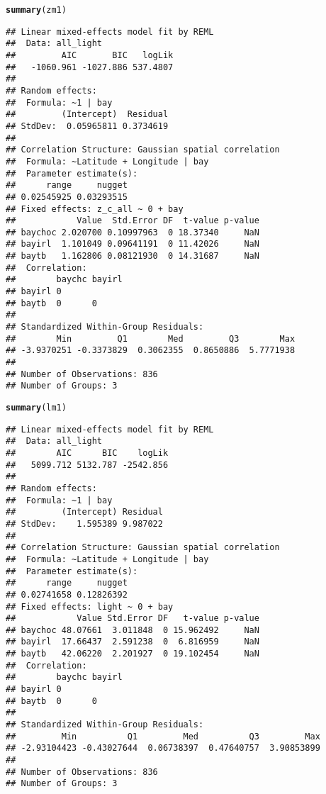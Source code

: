 \documentclass{article}\usepackage[]{graphicx}\usepackage[]{color}
\makeatletter
\newcommand{\hlstd}[1]{\textcolor[rgb]{0.345,0.345,0.345}{#1}}%
\newcommand{\hlkwd}[1]{\textcolor[rgb]{0.737,0.353,0.396}{\textbf{#1}}}%
\newenvironment{kframe}{%
 \def\at@end@of@kframe{}%
 \ifinner\ifhmode%
  \def\at@end@of@kframe{\end{minipage}}%
  \begin{minipage}{\columnwidth}%
 \fi\fi%
 \def\FrameCommand##1{\hskip\@totalleftmargin \hskip-\fboxsep
 \colorbox{shadecolor}{##1}\hskip-\fboxsep
     \hskip-\linewidth \hskip-\@totalleftmargin \hskip\columnwidth}%
 \MakeFramed {\advance\hsize-\width
   \@totalleftmargin\z@ \linewidth\hsize
   \@setminipage}}%
 {\par\unskip\endMakeFramed%
 \at@end@of@kframe}
\newenvironment{knitrout}{}{} %
\makeatother
\begin{document}
\begin{knitrout}
\color{fgcolor}\begin{kframe}
\begin{alltt}
\hlkwd{summary}\hlstd{(zm1)}
\end{alltt}
\begin{verbatim}
## Linear mixed-effects model fit by REML
##  Data: all_light 
##         AIC       BIC   logLik
##   -1060.961 -1027.886 537.4807
## 
## Random effects:
##  Formula: ~1 | bay
##         (Intercept)  Residual
## StdDev:  0.05965811 0.3734619
## 
## Correlation Structure: Gaussian spatial correlation
##  Formula: ~Latitude + Longitude | bay 
##  Parameter estimate(s):
##      range     nugget 
## 0.02545925 0.03293515 
## Fixed effects: z_c_all ~ 0 + bay 
##            Value  Std.Error DF  t-value p-value
## baychoc 2.020700 0.10997963  0 18.37340     NaN
## bayirl  1.101049 0.09641191  0 11.42026     NaN
## baytb   1.162806 0.08121930  0 14.31687     NaN
##  Correlation: 
##        baychc bayirl
## bayirl 0            
## baytb  0      0     
## 
## Standardized Within-Group Residuals:
##        Min         Q1        Med         Q3        Max 
## -3.9370251 -0.3373829  0.3062355  0.8650886  5.7771938 
## 
## Number of Observations: 836
## Number of Groups: 3
\end{verbatim}
\begin{alltt}
\hlkwd{summary}\hlstd{(lm1)}
\end{alltt}
\begin{verbatim}
## Linear mixed-effects model fit by REML
##  Data: all_light 
##        AIC      BIC    logLik
##   5099.712 5132.787 -2542.856
## 
## Random effects:
##  Formula: ~1 | bay
##         (Intercept) Residual
## StdDev:    1.595389 9.987022
## 
## Correlation Structure: Gaussian spatial correlation
##  Formula: ~Latitude + Longitude | bay 
##  Parameter estimate(s):
##      range     nugget 
## 0.02741658 0.12826392 
## Fixed effects: light ~ 0 + bay 
##            Value Std.Error DF   t-value p-value
## baychoc 48.07661  3.011848  0 15.962492     NaN
## bayirl  17.66437  2.591238  0  6.816959     NaN
## baytb   42.06220  2.201927  0 19.102454     NaN
##  Correlation: 
##        baychc bayirl
## bayirl 0            
## baytb  0      0     
## 
## Standardized Within-Group Residuals:
##         Min          Q1         Med          Q3         Max 
## -2.93104423 -0.43027644  0.06738397  0.47640757  3.90853899 
## 
## Number of Observations: 836
## Number of Groups: 3
\end{verbatim}
\end{kframe}
\end{knitrout}
\end{document}
